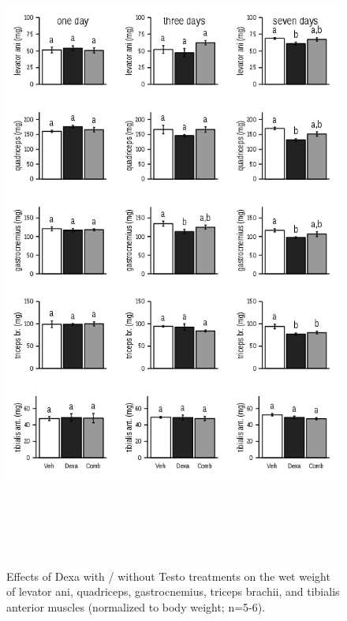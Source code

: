\documentclass[12pt,english]{report}\usepackage[]{graphicx}\usepackage[]{color}
\newenvironment{knitrout}{}{} %
\begin{document}
\begin{figure}
\begin{knitrout}
\color{fgcolor}
\includegraphics[width=6in,height=8.5in]{figure/muscleweights-1} 

\end{knitrout}

\protect\caption[Effects of Dexa with / without Testo treatments on individual muscle
weights.]{Effects of Dexa with / without Testo treatments on the wet weight
of levator ani, quadriceps, gastrocnemius, triceps brachii, and tibialis
anterior muscles (normalized to body weight; n=5-6).\label{fig:Muscles-weights}}
\end{figure}
\end{document}
